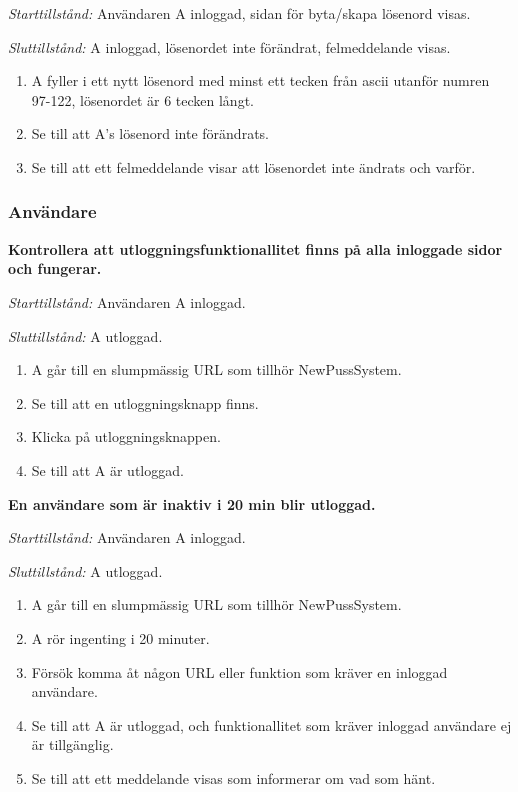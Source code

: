 \documentclass[a4paper]{article}
\begin{document}
\begin{FT}
\emph{Starttillstånd:} Användaren A inloggad, sidan för byta/skapa lösenord visas.

\emph{Sluttillstånd:} A inloggad, lösenordet inte förändrat, felmeddelande visas.

\begin{enumerate}
\item A fyller i ett nytt lösenord med minst ett tecken från ascii utanför numren 97-122, lösenordet är 6 tecken långt.
\item Se till att A's lösenord inte förändrats.
\item Se till att ett felmeddelande visar att lösenordet inte ändrats och varför.
\end{enumerate}



\subsubsection{Användare}

\item
\textbf{Kontrollera att utloggningsfunktionallitet finns på alla inloggade sidor och fungerar.}

\emph{Starttillstånd:} Användaren A inloggad.

\emph{Sluttillstånd:} A utloggad.

\begin{enumerate}
\item A går till en slumpmässig URL som tillhör NewPussSystem.
\item Se till att en utloggningsknapp finns.
\item Klicka på utloggningsknappen.
\item Se till att A är utloggad.
\end{enumerate}

\item
\textbf{En användare som är inaktiv i 20 min blir utloggad.}

\emph{Starttillstånd:} Användaren A inloggad.

\emph{Sluttillstånd:} A utloggad.

\begin{enumerate}
\item A går till en slumpmässig URL som tillhör NewPussSystem.
\item A rör ingenting i 20 minuter.
\item Försök komma åt någon URL eller funktion som kräver en inloggad användare.
\item Se till att A är utloggad, och funktionallitet som kräver inloggad användare ej är tillgänglig.
\item Se till att ett meddelande visas som informerar om vad som hänt.
\end{enumerate}


\end{FT}
\end{document}
